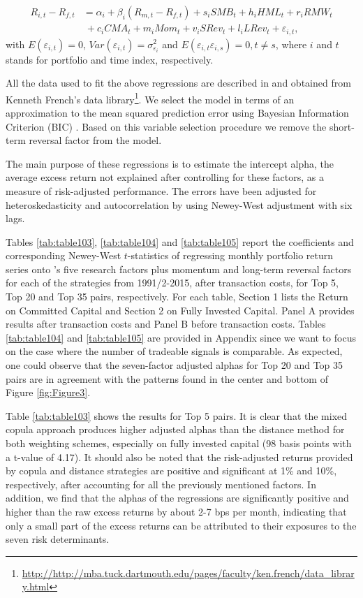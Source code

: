 	\begin{equation}
	\begin{aligned}
	R_{i,t}-R_{f,t}&=\alpha _{i}+\beta _{i}\left( R_{m,t}-R_{f,t}\right)+s_{i}SMB_{t}+h_{i}HML_{t}+r_{i}RMW_{t}\\
	&~+c_{i}CMA_{t}+m_{i}Mom_{t}+v_{i}SRev_{t}+l_{i}LRev_{t}+\varepsilon _{i,t},
	\end{aligned}
	\label{eq:eq101}
	\end{equation}
with $E(\varepsilon _{i,t})=0$, $Var(\varepsilon _{i,t})=\sigma_{\varepsilon _{i}}^{2}$ and $E(\varepsilon _{i,t}\varepsilon _{i,s})=0, t \neq s$, where $i$ and $t$ stands for portfolio and time index, respectively.
	
		All the data used to fit the above regressions are described in and obtained from Kenneth French’s data library\footnote{\url{http://http://mba.tuck.dartmouth.edu/pages/faculty/ken.french/data_library.html}}. We select the model in terms of an approximation to the mean squared prediction error using Bayesian Information Criterion (BIC) \citep{Schwarz1978}. Based on this variable selection procedure we remove the short-term reversal factor from the model. 
	
	The main purpose of these regressions is to estimate the intercept alpha, the average excess return not explained after controlling for these factors, as a measure of risk-adjusted performance. The errors have been adjusted for heteroskedasticity and autocorrelation by using Newey-West adjustment with six lags.
	
	Tables \ref{tab:table103}, \ref{tab:table104} and \ref{tab:table105} report the coefficients and corresponding Newey-West $t$-statistics of regressing monthly portfolio return series onto \citet*{ff15}'s five research factors plus momentum and long-term reversal factors for each of the strategies from 1991/2-2015, after transaction costs, for Top 5, Top 20 and Top 35 pairs, respectively. For each table, Section 1 lists the Return on Committed Capital and Section 2 on Fully Invested Capital. Panel A provides results after transaction costs and Panel B before transaction costs. Tables \ref{tab:table104} and \ref{tab:table105} are provided in Appendix since we want to focus on the case where the number of tradeable signals is comparable. As expected, one could observe that the seven-factor adjusted alphas for Top 20 and Top 35 pairs are in agreement with the patterns found in the center and bottom of Figure \ref{fig:Figure3}.
	
	Table \ref{tab:table103} shows the results for Top 5 pairs. It is clear that the mixed copula approach produces higher adjusted alphas than the distance method for both weighting schemes, especially on fully invested capital (98 basis points with a t-value of 4.17). It should also be noted that the risk-adjusted returns provided by copula and distance strategies are positive and significant at 1\% and 10\%, respectively, after accounting for all the previously mentioned factors. In addition, we find that the alphas of the regressions are significantly positive and higher than the raw excess returns by about 2-7 bps per month, indicating that only a small part of the excess returns can be attributed to their exposures to the seven risk determinants.

